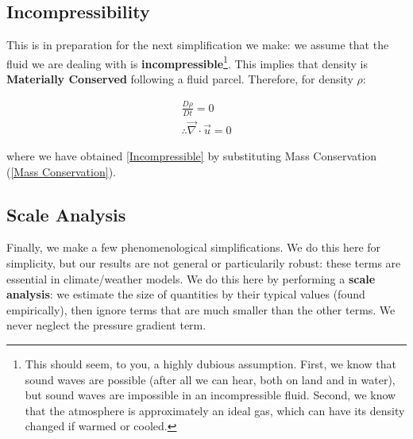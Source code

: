 \subsection{Incompressibility}

This is in preparation for the next simplification we make: we assume that the fluid we are dealing with is \textbf{incompressible}\footnote{
    This should seem, to you, a highly dubious assumption. First, we know that sound waves are possible (after all we can hear, both on land and in water), but sound waves are impossible in an incompressible fluid. Second, we know that the atmosphere is approximately an ideal gas, which can have its density changed if warmed or cooled.
}. This implies that density is \textbf{Materially Conserved} following a fluid parcel. Therefore, for density $\rho$:

\begin{align}
    \frac{D\rho}{Dt}=0\nonumber\\
    \therefore \boxed{\vec{\nabla}\cdot \vec{u}=0}\label{Incompressible}
\end{align}

\noindent  where we have obtained \ref{Incompressible} by substituting Mass Conservation (\ref{Mass Conservation}).

\subsection{Scale Analysis}

Finally, we make a few phenomenological simplifications. We do this here for simplicity, but our results are not general or particularily robust: these terms are essential in climate/weather models.
We do this here by performing a \textbf{scale analysis}: we estimate the size of quantities by their typical values (found empirically), then ignore terms that are much smaller than the other terms. We never neglect the pressure gradient term. \newline

